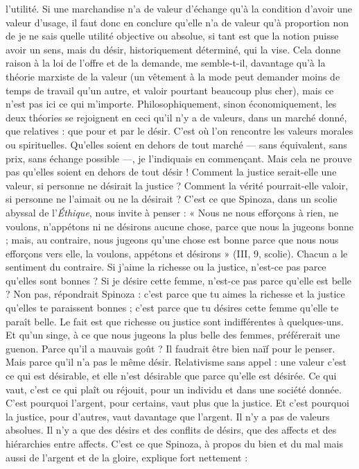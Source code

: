 l'utilité. Si une marchandise n’a de valeur d'échange qu’à la condition d’avoir
une valeur d'usage, il faut donc en conclure qu’elle n’a de valeur qu’à proportion
non de je ne sais quelle utilité objective ou absolue, si tant est que la
notion puisse avoir un sens, mais du désir, historiquement déterminé, qui la
vise. Cela donne raison à la loi de l'offre et de la demande, me semble-t-il,
davantage qu’à la théorie marxiste de la valeur (un vêtement à la mode peut
demander moins de temps de travail qu’un autre, et valoir pourtant beaucoup
plus cher), mais ce n’est pas ici ce qui m'importe. Philosophiquement, sinon
économiquement, les deux théories se rejoignent en ceci qu’il n’y a de valeurs,
dans un marché donné, que relatives : que pour et par le désir. C’est où l’on
rencontre les valeurs morales ou spirituelles. Qu’elles soient en dehors de tout
marché — sans équivalent, sans prix, sans échange possible —, je l’indiquais en
commençant. Mais cela ne prouve pas qu’elles soient en dehors de tout désir !
Comment la justice serait-elle une valeur, si personne ne désirait la justice ?
Comment la vérité pourrait-elle valoir, si personne ne l’aimait ou ne la
désirait ? C’est ce que Spinoza, dans un scolie abyssal de l’{\it Éthique}, nous invite
à penser : « Nous ne nous efforçons à rien, ne voulons, n’appétons ni ne désirons
aucune chose, parce que nous la jugeons bonne ; mais, au contraire, nous
jugeons qu’une chose est bonne parce que nous nous efforçons vers elle, la voulons,
appétons et désirons » (III, 9, scolie). Chacun a le sentiment du contraire.
Si j'aime la richesse ou la justice, n’est-ce pas parce qu’elles sont bonnes ? Si je
désire cette femme, n’est-ce pas parce qu’elle est belle ? Non pas, répondrait
Spinoza : c’est parce que tu aimes la richesse et la justice qu’elles te paraissent
bonnes ; c’est parce que tu désires cette femme qu’elle te paraît belle. Le fait est
que richesse ou justice sont indifférentes à quelques-uns. Et qu’un singe, à ce
que nous jugeons la plus belle des femmes, préférerait une guenon. Parce qu’il
a mauvais goût ? Il faudrait être bien naïf pour le penser. Mais parce qu’il n’a
pas le même désir. Relativisme sans appel : une valeur c’est ce qui est désirable,
et elle n’est désirable que parce qu’elle est désirée. Ce qui vaut, c’est ce qui plaît
ou réjouit, pour un individu et dans une société donnée. C’est pourquoi
l'argent, pour certains, vaut plus que la justice. Et c’est pourquoi la justice,
pour d’autres, vaut davantage que l’argent. Il n’y a pas de valeurs absolues. Il
n'y a que des désirs et des conflits de désirs, que des affects et des hiérarchies
entre affects. C’est ce que Spinoza, à propos du bien et du mal mais aussi de
l'argent et de la gloire, explique fort nettement :


